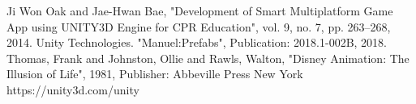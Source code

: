 \documentclass[12pt, a4paper, titlepage]{article}
\begin{document}
\begin{thebibliography}{00}
 Ji Won Oak and Jae-Hwan Bae, "Development of Smart Multiplatform Game App using UNITY3D Engine for CPR Education", vol. 9, no. 7, pp. 263--268, 2014.
 Unity Technologies. "Manuel:Prefabs", Publication: 2018.1-002B, 2018.
 Thomas, Frank and Johnston, Ollie and Rawls, Walton, "Disney Animation: The Illusion of Life", 1981, Publisher: Abbeville Press New York
 https://unity3d.com/unity
\end{thebibliography}
\end{document}
